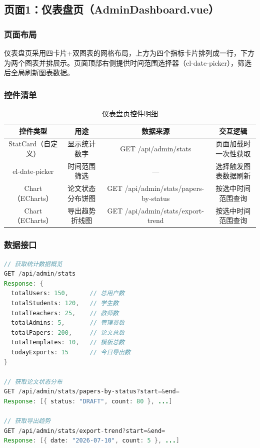 \documentclass{../softeng}
\begin{document}
\subsection{页面1：仪表盘页（AdminDashboard.vue）}

\subsubsection{页面布局}
仪表盘页采用四卡片+双图表的网格布局，上方为四个指标卡片排列成一行，下方为两个图表并排展示。页面顶部右侧提供时间范围选择器（el-date-picker），筛选后全局刷新图表数据。

\subsubsection{控件清单}
\begin{table}[htbp]
\centering
\caption{仪表盘页控件明细}
\label{tab:admin_dashboard}
\begin{tabular}{|c|c|c|c|}
\hline
\textbf{控件类型} & \textbf{用途} & \textbf{数据来源} & \textbf{交互逻辑} \\
\hline
StatCard（自定义） & 显示统计数字 & GET /api/admin/stats & 页面加载时一次性获取 \\
\hline
el-date-picker & 时间范围筛选 & — & 选择触发图表数据刷新 \\
\hline
Chart（ECharts） & 论文状态分布饼图 & GET /api/admin/stats/papers-by-status & 按选中时间范围查询 \\
\hline
Chart（ECharts） & 导出趋势折线图 & GET /api/admin/stats/export-trend & 按选中时间范围查询 \\
\hline
\end{tabular}
\end{table}

\subsubsection{数据接口}
\begin{lstlisting}[language=Java,caption={仪表盘数据接口定义}]
// 获取统计数据概览
GET /api/admin/stats
Response: {
  totalUsers: 150,      // 总用户数
  totalStudents: 120,   // 学生数
  totalTeachers: 25,    // 教师数
  totalAdmins: 5,       // 管理员数
  totalPapers: 200,     // 论文总数
  totalTemplates: 10,   // 模板总数
  todayExports: 15      // 今日导出数
}

// 获取论文状态分布
GET /api/admin/stats/papers-by-status?start=&end=
Response: [{ status: "DRAFT", count: 80 }, ...]

// 获取导出趋势
GET /api/admin/stats/export-trend?start=&end=
Response: [{ date: "2026-07-10", count: 5 }, ...]
\end{lstlisting}
\end{document}
